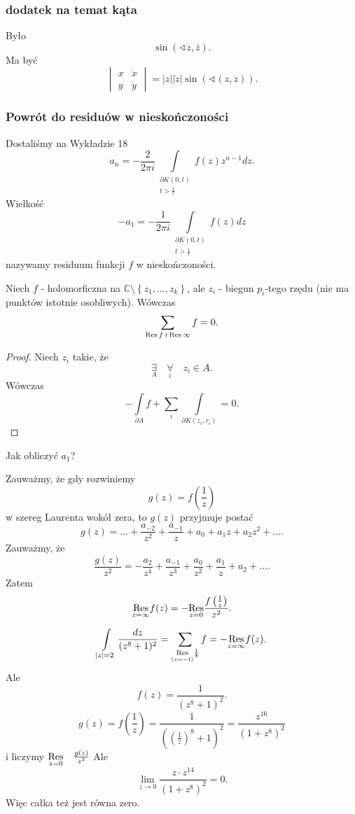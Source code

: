 \documentclass[../main.tex]{subfiles}
\begin{document}
    \subsubsection{dodatek na temat kąta}
    Było
    \[
        \sin(\sphericalangle \dot{z}, \bar{z})
    .\]
Ma być
\[
    \begin{vmatrix} x &\dot{x}\\ y & \dot{y} \end{vmatrix} = |z| |\dot{z}| \sin\left( \sphericalangle(z,\dot{z}) \right)
.\]
\subsubsection{Powrót do residuów w nieskończoności}
Dostaliśmy na Wykładzie 18
\[
    a_n = - \frac{2}{2 \pi i} \int\limits_{\substack{\partial K(0,t)\\ t > \frac{1}{r}}} f(z) z^{n-1}dz
.\]
Wielkość
\[
    - a_1 = - \frac{1}{2\pi i}\int\limits_{\substack{\partial K(0,t)\\ t > \frac{1}{r}}}f(z) dz
\]
nazywamy residuum funkcji $f$ w nieskończoności.
\begin{stw}
    Niech $f$ - holomorficzna na $\mathbb{C}\setminus \left\{ z_1,\ldots,z_k \right\} $, ale $z_i$ - biegun $p_i$-tego rzędu (nie ma punktów istotnie osobliwych). Wówczas
    \[
    \sum_{\operatorname{Res} f + \operatorname{Res} \infty}f = 0
    .\]
\end{stw}
\begin{proof}
    Niech $z_i$ takie, że
    \[
    \underset{A}{\exists} \quad \underset{i}{\forall}\quad z_i\in A
    .\]
Wówczas
\[
    -\int\limits_{\partial A}f + \sum_i\int\limits_{\partial K(z_i,r_i)} = 0
.\]
\end{proof}
\begin{pytanie}Jak obliczyć $a_1$?\end{pytanie}
    Zauważmy, że gdy rozwiniemy
    \[
        g(z) = f\left(\frac{1}{z}\right)
    \]
    w szereg Laurenta wokół zera, to $g(z)$ przyjmuje postać
    \[
        g(z) = \ldots + \frac{a_{-2}}{z^2} + \frac{a_{-1}}{z} + a_0 + a_1z + a_2z^2 + \ldots
    .\]
Zauważmy, że
\[
    \frac{g(z)}{z^2} = -\frac{a_{2}}{z^4} + \frac{a_{-1}}{z^3} + \frac{a_0}{z^2} + \frac{a_1}{z} + a_2 + \ldots
.\]
Zatem
\[
    \underset{z = \infty}{\operatorname{Res}} f(z) = - \underset{z = 0}{\operatorname{Res}} \frac{f\left( \frac{1}{z} \right) }{z^2}
.\]
\begin{przyklad}
    \[
        \int\limits_{|z| = 2}\frac{dz}{(z^8 + 1)^2} = \sum\limits_{\underset{(z = -1)}{\operatorname{Res}} \frac{1}{8}} f = - \underset{z = \infty}{\operatorname{Res}} f(z)
    .\]
Ale
\[
    f(z) = \frac{1}{(z^8 + 1)^2}
.\]
\[
    g(z) = f\left( \frac{1}{z} \right) = \frac{1}{\left( \left( \frac{1}{z} \right) ^8 + 1 \right) ^2} = \frac{z^{16}}{(1 + z^8)^2}
\]
    i liczymy $\underset{z = 0}{\operatorname{Res}}\quad \frac{g(z)}{z^2}$
    Ale
    \[
        \lim\limits_{z\to 0}\frac{z\cdot z^{14}}{(1+z^8)^2} = 0
    .\]
Więc całka też jest równa zero.
\end{przyklad}
\end{document}

